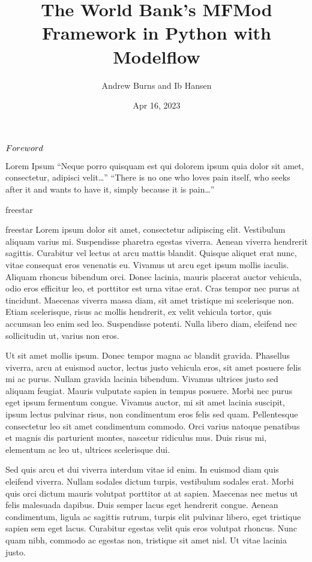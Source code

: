 \documentclass[letterpaper,10pt,english]{jupyterBook}
\title{The World Bank's MFMod Framework in Python with Modelflow}
\date{Apr 16, 2023}
\author{Andrew Burns and Ib Hansen}
\begin{document}
\pagestyle{empty}
\sphinxmaketitle
\pagestyle{plain}
\sphinxtableofcontents
\pagestyle{normal}
\label{\detokenize{content/introduction::doc}}


\sphinxAtStartPar
\(\Large{Foreword}\)

\sphinxAtStartPar
Lorem Ipsum
“Neque porro quisquam est qui dolorem ipsum quia dolor sit amet, consectetur, adipisci velit…”
“There is no one who loves pain itself, who seeks after it and wants to have it, simply because it is pain…”

\sphinxAtStartPar
freestar

\sphinxAtStartPar
freestar
Lorem ipsum dolor sit amet, consectetur adipiscing elit. Vestibulum aliquam varius mi. Suspendisse pharetra egestas viverra. Aenean viverra hendrerit sagittis. Curabitur vel lectus at arcu mattis blandit. Quisque aliquet erat nunc, vitae consequat eros venenatis eu. Vivamus ut arcu eget ipsum mollis iaculis. Aliquam rhoncus bibendum orci. Donec lacinia, mauris placerat auctor vehicula, odio eros efficitur leo, et porttitor est urna vitae erat. Cras tempor nec purus at tincidunt. Maecenas viverra massa diam, sit amet tristique mi scelerisque non. Etiam scelerisque, risus ac mollis hendrerit, ex velit vehicula tortor, quis accumsan leo enim sed leo. Suspendisse potenti. Nulla libero diam, eleifend nec sollicitudin ut, varius non eros.

\sphinxAtStartPar
Ut sit amet mollis ipsum. Donec tempor magna ac blandit gravida. Phasellus viverra, arcu at euismod auctor, lectus justo vehicula eros, sit amet posuere felis mi ac purus. Nullam gravida lacinia bibendum. Vivamus ultrices justo sed aliquam feugiat. Mauris vulputate sapien in tempus posuere. Morbi nec purus eget ipsum fermentum congue. Vivamus auctor, mi sit amet lacinia suscipit, ipsum lectus pulvinar risus, non condimentum eros felis sed quam. Pellentesque consectetur leo sit amet condimentum commodo. Orci varius natoque penatibus et magnis dis parturient montes, nascetur ridiculus mus. Duis risus mi, elementum ac leo ut, ultrices scelerisque dui.

\sphinxAtStartPar
Sed quis arcu et dui viverra interdum vitae id enim. In euismod diam quis eleifend viverra. Nullam sodales dictum turpis, vestibulum sodales erat. Morbi quis orci dictum mauris volutpat porttitor at at sapien. Maecenas nec metus ut felis malesuada dapibus. Duis semper lacus eget hendrerit congue. Aenean condimentum, ligula ac sagittis rutrum, turpis elit pulvinar libero, eget tristique sapien sem eget lacus. Curabitur egestas velit quis eros volutpat rhoncus. Nunc quam nibh, commodo ac egestas non, tristique sit amet nisl. Ut vitae lacinia justo.
\end{document}
